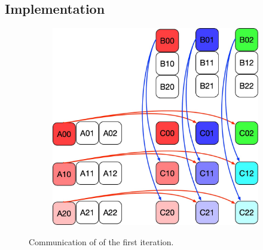 
\subsection{Implementation}


\begin{figure}[t!]
  \centering
  \begin{subfigure}{0.40\columnwidth}
    \includegraphics[width=\linewidth]{figures/gemm_summa_k0.jpg}
  \end{subfigure}
  \caption{Communication of \summa of the first iteration.}
  \label{fig:gemm_summa_k0}
\end{figure}



